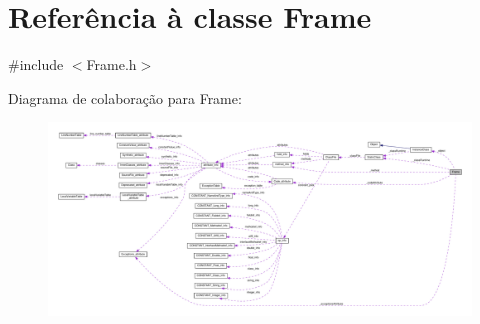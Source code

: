 \hypertarget{classFrame}{}\section{Referência à classe Frame}
\label{classFrame}


{\ttfamily \#include $<$Frame.\+h$>$}



Diagrama de colaboração para Frame\+:
\nopagebreak
\begin{figure}[H]
\begin{center}
\leavevmode
\includegraphics[width=350pt]{classFrame__coll__graph}
\end{center}
\end{figure}
